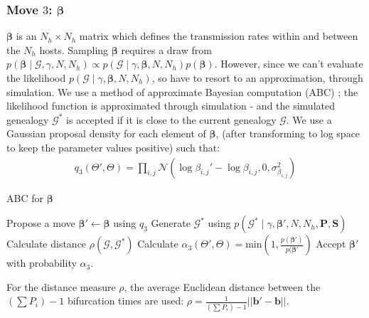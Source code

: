 \documentclass[a4paper,18pt]{report}
\begin{document}
\subsubsection{Move $3$: $\boldsymbol\beta$}
$\boldsymbol\beta$ is an $N_h \times N_h$ matrix which defines the transmission rates within and between the $N_h$ hosts. Sampling $\boldsymbol\beta$ requires a draw from $p(\boldsymbol{\beta}\mid\mathcal{G},\gamma,N,N_h)\propto p(\mathcal{G}\mid\gamma, \boldsymbol{\beta},N,N_h)p(\boldsymbol{\beta})$. However, since we can't evaluate the likelihood $p(\mathcal{G}\mid\gamma, \boldsymbol{\beta},N,N_h)$, so have to resort to an approximation, through simulation. We use a method of approximate Bayesian computation (ABC) ; the likelihood function is approximated through simulation - and the simulated genealogy $\mathcal{G}^*$ is accepted if it is close to the current genealogy $\mathcal{G}$. We use a Gaussian proposal density for each element of $\boldsymbol{\beta}$, (after transforming to log space to keep the parameter values positive) such that:
\begin{eqnarray}
q_3(\Theta',\Theta)=\prod_{i,j} \mathcal{N}(\log \beta_{i,j}' - \log \beta_{i,j}, 0 , \sigma_{\beta_{i,j}}^2)
\end{eqnarray}
\begin{algorithm}
\caption{ABC for $\boldsymbol\beta$ \label{alg:beta}}
\begin{algorithmic}
\STATE Propose a move $\boldsymbol{\beta}'\gets \boldsymbol{\beta}$ using $q_3$
\STATE Generate $\mathcal{G}^*$ using $p(\mathcal{G}^*\mid \gamma, \boldsymbol{\beta}', N, N_h, \mathbf{P}, \mathbf{S})$
\STATE Calculate distance $\rho(\mathcal{G},\mathcal{G}^*)$
\STATE Calculate $\alpha_{3}(\Theta',\Theta)=\textrm{min}\left(1,\frac{p(\boldsymbol{\beta}')}{p(\boldsymbol{\beta}'} \right)$
\STATE Accept $\boldsymbol{\beta}'$ with probability $\alpha_3$.
\ENDIF
\end{algorithmic}
\end{algorithm}
For the distance measure $\rho$, the average Euclidean distance between the $(\sum P_i) -1$ bifurcation times are used: $\rho = \frac{1}{(\sum P_i) -1}||\mathbf{b}'-\mathbf{b}||$.
\end{document}

